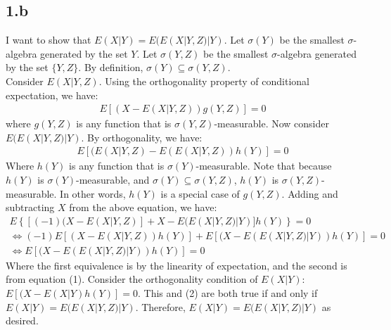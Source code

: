 \subsection{1.b}
I want to show that \(E(X|Y) = E(E(X|Y,Z)|Y)\). 
Let \(\sigma(Y)\) be the smallest $\sigma$-algebra generated by the set $Y$.  Let \(\sigma(Y,Z)\) be the smallest $\sigma$-algebra generated by the set $\{Y,Z\}$.  By definition, \(\sigma(Y) \subseteq \sigma(Y,Z)\).
\\
Consider \(E(X|Y,Z)\).  Using the orthogonality property of conditional expectation, we have:
\begin{gather}
    E[(X-E(X|Y,Z))g(Y,Z)]=0
\end{gather}
where \(g(Y,Z)\) is any function that is \(\sigma(Y,Z)\)-measurable.
Now consider \(E(E(X|Y,Z)|Y)\).  By orthogonality, we have:
\begin{gather*}
    E[(E(X|Y,Z)-E(E(X|Y,Z))h(Y)] =0
\end{gather*}
Where \(h(Y)\) is any function that is \(\sigma(Y)\)-measurable.  Note that because \(h(Y)\) is \(\sigma(Y)\)-measurable, and \(\sigma(Y) \subseteq \sigma(Y,Z)\), \(h(Y)\) is \(\sigma(Y,Z)\)-measurable.  In other words, \(h(Y)\) is a special case of \(g(Y,Z)\).
Adding and subtracting $X$ from the above equation, we have:
\begin{gather}
    E\left\{[(-1)(X-E(X|Y,Z)] + X-E(E(X|Y,Z)|Y)]h(Y)\right\}=0 \nonumber \\
    \Leftrightarrow (-1)E[(X-E(X|Y,Z))h(Y)] + E[(X-E(E(X|Y,Z)|Y))h(Y)] = 0 \nonumber \\
    \Leftrightarrow E[(X-E(E(X|Y,Z)|Y))h(Y)] = 0
\end{gather}
Where the first equivalence is by the linearity of expectation, and the second is from equation (1).
Consider the orthogonality condition of \(E(X|Y)\): \(E[(X-E(X|Y)h(Y)] = 0\).  This and (2) are both true if and only if \(E(X|Y) = E(E(X|Y,Z)|Y)\).
Therefore, \(E(X|Y) = E(E(X|Y,Z)|Y)\) as desired.
